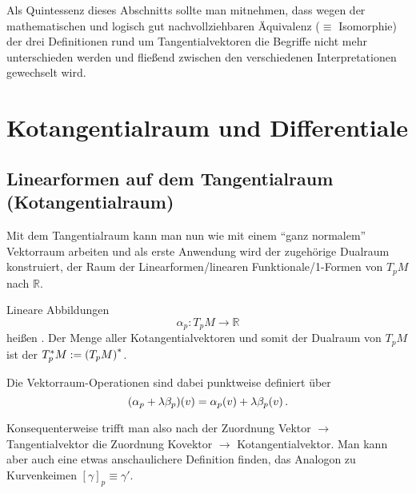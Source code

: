 \documentclass[../H_Analysis_main.tex]{subfiles}
\begin{document}
Als Quintessenz dieses Abschnitts sollte man mitnehmen, dass wegen der mathematischen und logisch gut nachvollziehbaren Äquivalenz ($\equiv$ Isomorphie) der drei Definitionen rund um Tangentialvektoren die Begriffe nicht mehr unterschieden werden und fließend zwischen den verschiedenen Interpretationen gewechselt wird.



\newpage


	\section{Kotangentialraum und Differentiale}
		\subsection{Linearformen auf dem Tangentialraum (Kotangentialraum)}
Mit dem Tangentialraum kann man nun wie mit einem \enquote{ganz normalem} Vektorraum arbeiten und als erste Anwendung wird der zugehörige Dualraum konstruiert, der Raum der Linearformen/linearen Funktionale/1-Formen von $T_p M$ nach $\mathbb{R}$.

\begin{defi}[Kotangentialraum]
Lineare Abbildungen
\begin{equation}
\alpha_p: T_p M \rightarrow \mathbb{R}
\end{equation}
heißen . Der Menge aller Kotangentialvektoren und somit der Dualraum von $T_p M$ ist der  $T^*_p M := \qty(T_p M)^*$.

Die Vektorraum-Operationen sind dabei punktweise definiert über
\begin{equation}
\qty(\alpha_p + \lambda \beta_p)(v) = \alpha_p(v) + \lambda \beta_p(v) \, .
\end{equation}
\end{defi}
Konsequenterweise trifft man also nach der Zuordnung Vektor $\rightarrow$ Tangentialvektor die Zuordnung Kovektor $\rightarrow$ Kotangentialvektor. Man kann aber auch eine etwas anschaulichere Definition finden, das Analogon zu Kurvenkeimen $[\gamma]_p \equiv \gamma'$.
\end{document}
